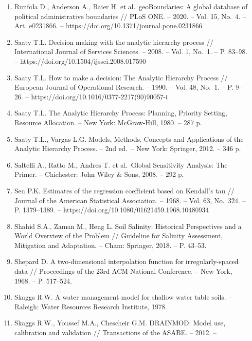 \begin{enumerate}
  Rouse J.W., Haas R.H., Schell J.A., Deering D.W. Monitoring vegetation
  systems in the Great Plains with ERTS // Third ERTS Symposium, NASA
  SP-351. -- Washington, 1974. -- Vol. 1. -- P. 309--317.
\item
  Runfola D., Anderson A., Baier H. et al.~geoBoundaries: A global
  database of political administrative boundaries // PLoS ONE. -- 2020.
  -- Vol. 15, No.~4. -- Art. e0231866. --
  https://doi.org/10.1371/journal.pone.0231866
\item
  Saaty T.L. Decision making with the analytic hierarchy process //
  International Journal of Services Sciences. -- 2008. -- Vol. 1, No.~1.
  -- P. 83--98. -- https://doi.org/10.1504/ijssci.2008.017590
\item
  Saaty T.L. How to make a decision: The Analytic Hierarchy Process //
  European Journal of Operational Research. -- 1990. -- Vol. 48, No.~1.
  -- P. 9--26. -- https://doi.org/10.1016/0377-2217(90)90057-i
\item
  Saaty T.L. The Analytic Hierarchy Process: Planning, Priority Setting,
  Resource Allocation. -- New York: McGraw-Hill, 1980. -- 287 p.
\item
  Saaty T.L., Vargas L.G. Models, Methods, Concepts and Applications of
  the Analytic Hierarchy Process. -- 2nd ed.~-- New York: Springer,
  2012. -- 346 p.
\item
  Saltelli A., Ratto M., Andres T. et al.~Global Sensitivity Analysis:
  The Primer. -- Chichester: John Wiley \& Sons, 2008. -- 292 p.
\item
  Sen P.K. Estimates of the regression coefficient based on Kendall's
  tau // Journal of the American Statistical Association. -- 1968. --
  Vol. 63, No.~324. -- P. 1379--1389. --
  https://doi.org/10.1080/01621459.1968.10480934
\item
  Shahid S.A., Zaman M., Heng L. Soil Salinity: Historical Perspectives
  and a World Overview of the Problem // Guideline for Salinity
  Assessment, Mitigation and Adaptation. -- Cham: Springer, 2018. -- P.
  43--53.
\item
  Shepard D. A two-dimensional interpolation function for
  irregularly-spaced data // Proceedings of the 23rd ACM National
  Conference. -- New York, 1968. -- P. 517--524.
\item
  Skaggs R.W. A water management model for shallow water table soils. --
  Raleigh: Water Resources Research Institute, 1978.
\item
  Skaggs R.W., Youssef M.A., Chescheir G.M. DRAINMOD: Model use,
  calibration and validation // Transactions of the ASABE. -- 2012. --

\end{enumerate}
